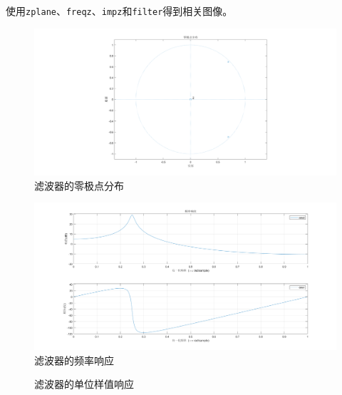 \documentclass[10pt, a4paper]{article}
\begin{document}
使用\texttt{zplane}、\texttt{freqz}、\texttt{impz}和\texttt{filter}得到相关图像。

\begin{figure}[h]
    \centering
    \includegraphics[width=.8\textwidth]{../assets/1_1_zplane.png}
    \caption{滤波器的零极点分布}
    \label{fig:exp1_1_zplane}
\end{figure}

\begin{figure}[h]
    \centering
    \includegraphics[width=.8\textwidth]{../assets/1_1_freqz.png}
    \caption{滤波器的频率响应}
    \label{fig:exp1_1_freqz}
\end{figure}

\begin{figure}[!ht]
    \centering
    \caption{滤波器的单位样值响应}
    \label{fig:exp1_1_impz}
\end{figure}
\end{document}

